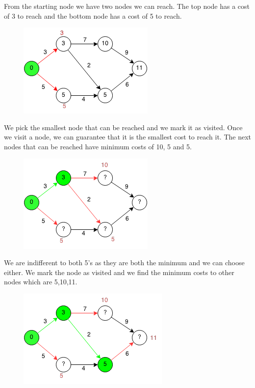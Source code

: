 \documentclass[11pt,oneside]{book}
\makeatletter
\def\maxwidth#1{\ifdim\Gin@nat@width>#1 #1\else\Gin@nat@width\fi}
\makeatother
\begin{document}
From the starting node we have two nodes we can reach. The top node has a cost of 3 to reach and the bottom node has a cost of 5 to reach.

\vspace{5px}\begin{figure}[H]\centering
        \includegraphics[width=0.66\maxwidth{\textwidth}]{djikstra1.png}
        \end{figure}

We pick the smallest node that can be reached and we mark it as visited. Once we visit a node, we can guarantee that it is the smallest cost to reach it. The next nodes that can be reached have minimum costs of 10, 5 and 5.

\vspace{5px}\begin{figure}[H]\centering
        \includegraphics[width=0.66\maxwidth{\textwidth}]{djikstra2.png}
        \end{figure}

We are indifferent to both 5's as they are both the minimum and we can choose either. We mark the node as visited and we find the minimum costs to other nodes which are 5,10,11.

\vspace{5px}\begin{figure}[H]\centering
        \includegraphics[width=0.66\maxwidth{\textwidth}]{djikstra3.png}
        \end{figure}
\end{document}
